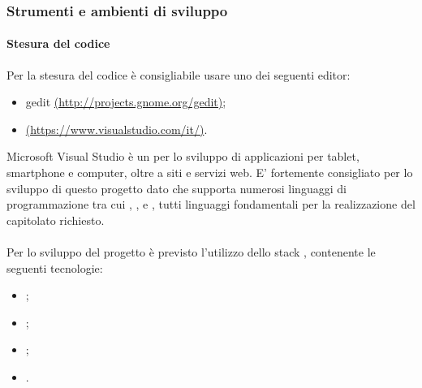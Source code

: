 \subsubsection{Strumenti e ambienti di sviluppo}
\paragraph{Stesura del codice}
Per la stesura del codice è consigliabile usare uno dei seguenti editor:
\begin{itemize}
\item gedit \href{http://projects.gnome.org/gedit}{(http://projects.gnome.org/gedit)};
\item {} \href{https://www.visualstudio.com/it/}{(https://www.visualstudio.com/it/)}.
\end{itemize}

Microsoft Visual Studio è un  per lo sviluppo di applicazioni per tablet, smartphone e computer, oltre a siti e servizi web. E' fortemente consigliato per lo sviluppo di questo progetto dato che supporta numerosi linguaggi di programmazione tra cui , ,  e , tutti linguaggi fondamentali per la realizzazione del capitolato richiesto.

\paragraph{}
Per lo sviluppo del progetto è previsto l'utilizzo dello stack , contenente le seguenti tecnologie:
\begin{itemize}
\item {};
\item {};
\item {};
\item {}.
\end{itemize}
